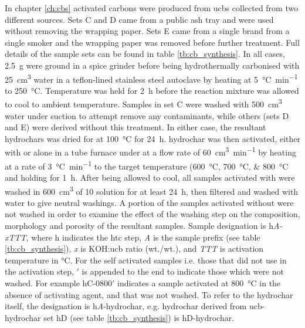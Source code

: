 In chapter \ref{ch:cbs} activated carbons were produced from \glspl{ucb} collected from two different sources. Sets C and D came from a public ash tray and were used without removing the wrapping paper. Sets E came from a single brand from a single smoker and the wrapping paper was removed before further treatment. Full details of the sample sets can be found in table \ref{tb:cb_synthesis}. In all cases, \qty{2.5}{\gram}  were ground in a spice grinder before being hydrothermally carbonised with \qty{25}{\cm\cubed} water in a teflon-lined stainless steel autoclave by heating at \qty{5}{\degreeCelsius\per\minute} to \qty{250}{\degreeCelsius}. Temperature was held for \qty{2}{\hour} before the reaction mixture was allowed to cool to ambient temperature. Samples in set C were washed with \qty{500}{\cm\cubed} water under suction to attempt remove any contaminants, while others (sets D and E) were derived without this treatment. In either case, the resultant \glspl{hydrochar} was dried for at \qty{100}{\degreeCelsius} for \qty{24}{\hour}. \Gls{hydrochar} was then activated, either with  or alone in a tube furnace under  at a flow rate of \qty{60}{\cm\cubed\per\minute} by heating at a rate of \qty{3}{\degreeCelsius\per\minute} to the target temperature (\qtylist[list-units=single, list-final-separator={ or }]{600;700;800}{\degreeCelsius} and holding for \qty{1}{\hour}. After being allowed to cool, all samples activated with  were washed in \qty{600}{\cm\cubed} of \qty{10}{\volpercent}  solution for at least \qty{24}{\hour}, then filtered and washed with water to give neutral washings. A portion of the samples activated without  were not washed in order to examine the effect of the washing step on the composition, morphology and porosity of the resultant samples. Sample designation is h\textit{A-xTTT}, where h indicates the \gls{htc} step, \textit{A} is the sample prefix (see table \ref{tb:cb_synthesis}), \textit{x} is KOH:\acrshort{ucb} ratio (wt./wt.), and \textit{TTT} is activation temperature in \unit{\degreeCelsius}. For the self activated samples i.e. those that did not use  in the activation step, $'$ is appended to the end to indicate those which were not washed. For example hC-0800$'$ indicates a sample activated at \qty{800}{\degreeCelsius} in the absence of \gls{activating agent}, and that was not washed. To refer to the \gls{hydrochar} itself, the designation is h\textit{A}-hydrochar, e.g. \gls{hydrochar} derived from \acrshort{ucb}-\gls{hydrochar} set hD (see table \ref{tb:cb_synthesis}) is hD-hydrochar.



